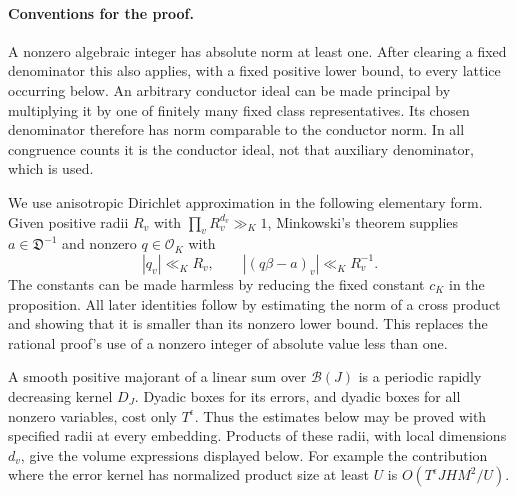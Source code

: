 \documentclass[11pt,reqno]{amsart}
\numberwithin{equation}{section}
\theoremstyle{definition}
\begin{document}
\paragraph{Conventions for the proof.}
A nonzero algebraic integer has absolute norm at least one.  After clearing
a fixed denominator this also applies, with a fixed positive lower bound,
to every lattice occurring below.  An arbitrary conductor ideal can be
made principal by multiplying it by one of finitely many fixed class
representatives.  Its chosen denominator therefore has norm comparable
to the conductor norm.  In all congruence counts it is the conductor ideal,
not that auxiliary denominator, which is used.

We use anisotropic Dirichlet approximation in the following elementary
form.  Given positive radii $R_v$ with $\prod_vR_v^{d_v}\gg_K1$, Minkowski's
theorem supplies $a\in\mathfrak D^{-1}$ and nonzero $q\in\mathcal O_K$ with
\[
 |q_v|\ll_KR_v,\qquad |(q\beta-a)_v|\ll_K R_v^{-1}.
\]
The constants can be made harmless by reducing the fixed constant $c_K$
in the proposition.  All later identities follow by estimating the norm
of a cross product and showing that it is smaller than its nonzero lower
bound.  This replaces the rational proof's use of a nonzero integer of
absolute value less than one.

A smooth positive majorant of a linear sum over $\mathcal B(J)$ is a
periodic rapidly decreasing kernel $D_J$.  Dyadic boxes for its errors,
and dyadic boxes for all nonzero variables, cost only $T^\epsilon$.
Thus the estimates below may be proved with specified radii at every
embedding.  Products of these radii, with local dimensions $d_v$, give
the volume expressions displayed below.  For example the contribution
where the error kernel has normalized product size at least $U$ is
$O(T^\epsilon JHM^2/U)$.
\end{document}
